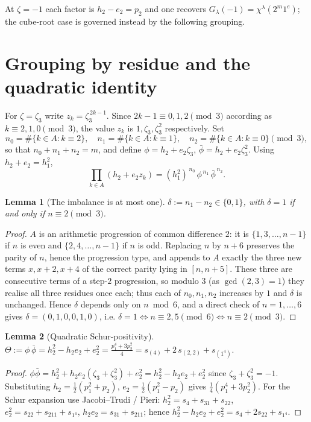 \documentclass[11pt]{article}
\newtheorem{lemma}{Lemma}
\theoremstyle{definition}
\theoremstyle{remark}
\newcommand{\la}{\lambda}
\newcommand{\zt}{\zeta_3}
\begin{document}
At $\zeta=-1$ each factor is $h_2-e_2=p_2$ and one recovers $G_\la(-1)=\chi^\la(2^m1^e)$;
the cube-root case is governed instead by the following grouping.

\section{Grouping by residue and the quadratic identity}

For $\zeta=\zt$ write $z_k=\zt^{\,2k-1}$. Since $2k-1\equiv 0,1,2\pmod 3$ according as
$k\equiv 2,1,0\pmod 3$, the value $z_k$ is $1,\zt,\zt^2$ respectively. Set
\[
  n_0=\#\{k\in A:k\equiv2\},\quad
  n_1=\#\{k\in A:k\equiv1\},\quad
  n_2=\#\{k\in A:k\equiv0\}\pmod 3,
\]
so that $n_0+n_1+n_2=m$, and define $\phi=h_2+e_2\zt$, $\bar\phi=h_2+e_2\zt^{2}$. Using
$h_2+e_2=h_1^2$,
\begin{equation}\label{eq:grouped}
  \prod_{k\in A}(h_2+e_2 z_k)=(h_1^2)^{\,n_0}\,\phi^{\,n_1}\,\bar\phi^{\,n_2}.
\end{equation}

\begin{lemma}[The imbalance is at most one]\label{lem:delta}
$\delta:=n_1-n_2\in\{0,1\}$, with $\delta=1$ if and only if $n\equiv 2\pmod 3$.
\end{lemma}

\begin{proof}
$A$ is an arithmetic progression of common difference $2$: it is
$\{1,3,\dots,n-1\}$ if $n$ is even and $\{2,4,\dots,n-1\}$ if $n$ is odd. Replacing $n$
by $n+6$ preserves the parity of $n$, hence the progression type, and appends to $A$
exactly the three new terms $x,x+2,x+4$ of the correct parity lying in $[n,n+5]$. These
three are consecutive terms of a step-$2$ progression, so modulo $3$ (as $\gcd(2,3)=1$)
they realise all three residues once each; thus each of $n_0,n_1,n_2$ increases by $1$
and $\delta$ is unchanged. Hence $\delta$ depends only on $n\bmod 6$, and a direct check
of $n=1,\dots,6$ gives $\delta=(0,1,0,0,1,0)$, i.e. $\delta=1\iff n\equiv2,5\pmod 6\iff
n\equiv2\pmod 3$.
\end{proof}

\begin{lemma}[Quadratic Schur-positivity]\label{lem:theta}
$\displaystyle \Theta:=\phi\,\bar\phi=h_2^2-h_2e_2+e_2^2=\frac{p_1^4+3p_2^2}{4}
   =s_{(4)}+2\,s_{(2,2)}+s_{(1^4)}.$
\end{lemma}

\begin{proof}
$\phi\bar\phi=h_2^2+h_2e_2(\zt+\zt^2)+e_2^2=h_2^2-h_2e_2+e_2^2$ since $\zt+\zt^2=-1$.
Substituting $h_2=\tfrac12(p_1^2+p_2)$, $e_2=\tfrac12(p_1^2-p_2)$ gives
$\tfrac14(p_1^4+3p_2^2)$. For the Schur expansion use Jacobi--Trudi /
Pieri: $h_2^2=s_{4}+s_{31}+s_{22}$, $e_2^2=s_{22}+s_{211}+s_{1^4}$,
$h_2e_2=s_{31}+s_{211}$; hence $h_2^2-h_2e_2+e_2^2=s_{4}+2s_{22}+s_{1^4}$.
\end{proof}
\end{document}
